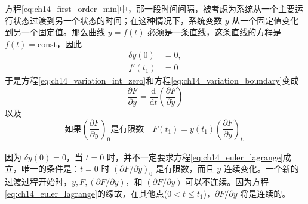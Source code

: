 方程\eqref{eq:ch14_first_order_min}中，那一段时间间隔，被考虑为系统从一个主要运行状态过渡到另一个状态的时间；在这种情况下，系统变数 $y$ 从一个固定值变化到另一个固定值。那么曲线 $y = f(t)$ 必须是一条直线，这条直线的方程是 $f(t) = \mathrm{const}$，因此
\begin{equation}
\left.
\begin{aligned}
\delta y(0) &= 0, \\
f'(t_1) &= 0
\end{aligned}
\right.
\label{eq:ch14_fixed_boundary}
\end{equation}
于是方程\eqref{eq:ch14_variation_int_zero}和方程\eqref{eq:ch14_variation_boundary}变成
\begin{equation}
\frac{\partial F}{\partial y} = \frac{\mathrm{d}}{\mathrm{d}t} \left( \frac{\partial F}{\partial \dot{y}} \right)
\label{eq:ch14_euler_lagrange}
\end{equation}
以及
\begin{equation}
\text{如果} \left( \frac{\partial F}{\partial \dot{y}} \right)_0 \text{是有限数} \quad F(t_1) = \dot{y}(t_1) \left( \frac{\partial F}{\partial \dot{y}} \right)_{t_1}
\label{eq:ch14_boundary_condition}
\end{equation}

因为 $\delta y(0)=0$，当 $t=0$ 时，并不一定要求方程\eqref{eq:ch14_euler_lagrange}成立，唯一的条件是：$t=0$ 时 $(\partial F/\partial \dot{y})_0$ 是有限数，而且 $y$ 连续变化。一个新的过渡过程开始时，$\dot{y}, F, (\partial F/\partial y)$，和 $(\partial F/\partial \dot{y})$ 可以不连续。因为方程\eqref{eq:ch14_euler_lagrange}的缘故，在其他点($0 < t \leqslant t_1$)，$\partial F/\partial y$ 将是连续的。

